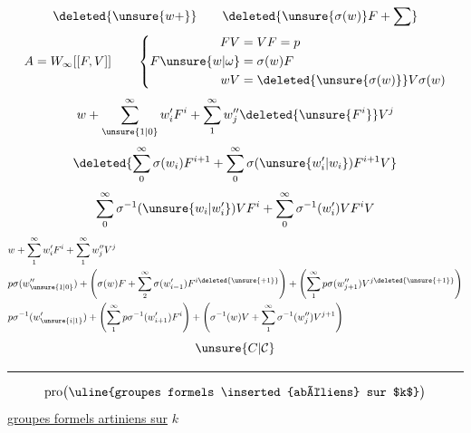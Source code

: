 \[
\deleted{\unsure{w+}}\qquad\deleted{\unsure{\sigma(w)}F+\sum}
\]
\[
A=W_\infty[[F,V]]\qquad
\left\{\begin{aligned}
FV&=VF=p\\
F\unsure{w|\omega}&=\sigma(w)F\\
wV&=\deleted{\unsure{\sigma(w)}}V\sigma(w)
\end{aligned}\right.
\]
\[
w+\sum_{\unsure{1|0}}^\infty w'_iF^i+\sum_1^\infty w''_j\deleted{\unsure{F^i}}V^j
\]
\[
\deleted{\sum_0^\infty\sigma(w_i)F^{i+1}+\sum_0^\infty\sigma(\unsure{w'_i|w_i})F^{i+1}V}
\]
\[
\sum_0^\infty\sigma^{-1}(\unsure{w_i|w'_i})VF^i+\sum_0^\infty\sigma^{-1}(w'_i)VF^iV
\]
\[
\begin{aligned}
&w+\sum_1^\infty w'_iF^i+\sum_1^\infty w''_jV^j\\
&p\sigma(w''_{\unsure{1|0}})+\left(\sigma(w)F+\sum_2^\infty\sigma(w'_{i-1})F^{i\deleted{\unsure{+1}}}\right)+\left(\sum_1^\infty p\sigma(w''_{j+1})V^{j\deleted{\unsure{+1}}}\right)\\
&p\sigma^{-1}(w'_{\unsure{i|1}})+\left(\sum_1^\infty p\sigma^{-1}(w'_{i+1})F^i\right)+\left(\sigma^{-1}(w)V+\sum_1^\infty\sigma^{-1}(w''_j)V^{j+1}\right)
\end{aligned}
\]
\[
\unsure{C|\mathcal{C}}
\]
\par\noindent\rule{\linewidth}{0.4pt}\par
\[
\operatorname{pro}\bigl(\text{\uline{groupes formels \inserted{abéliens} sur $k$}}\bigr)
\]
\uline{groupes formels artiniens sur} $k$

